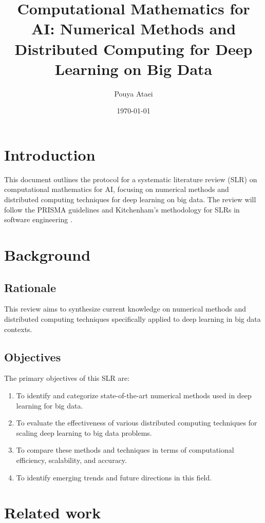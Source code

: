 \documentclass[a4paper,12pt]{article}
\title{Computational Mathematics for AI: Numerical Methods and Distributed Computing for Deep Learning on Big Data}
\author{Pouya Ataei}
\date{\today}
\begin{document}
\maketitle

\section{Introduction}
This document outlines the protocol for a systematic literature review (SLR) on computational mathematics for AI, focusing on numerical methods and distributed computing techniques for deep learning on big data. The review will follow the PRISMA guidelines \citep{moher2009preferred} and Kitchenham's methodology for SLRs in software engineering \citep{kitchenham2007guidelines}.

\section{Background}
\subsection{Rationale}

This review aims to synthesize current knowledge on numerical methods and distributed computing techniques specifically applied to deep learning in big data contexts.

\subsection{Objectives}
The primary objectives of this SLR are:
\begin{enumerate}
    \item To identify and categorize state-of-the-art numerical methods used in deep learning for big data.
    \item To evaluate the effectiveness of various distributed computing techniques for scaling deep learning to big data problems.
    \item To compare these methods and techniques in terms of computational efficiency, scalability, and accuracy.
    \item To identify emerging trends and future directions in this field.
\end{enumerate}
\section{Related work}

\end{document}

